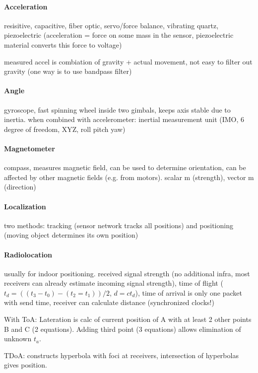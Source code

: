 \documentclass{article}
\begin{document}
\begin{multicols}{2}
    \paragraph{Acceleration} resisitive, capacitive, fiber optic, servo/force balance, vibrating quartz, piezoelectric (acceleration = force on some mass in the sensor, piezoelectric material converts this force to voltage)

    measured accel is combiation of gravity + actual movement, not easy to filter out gravity (one way is to use bandpass filter)

    \paragraph{Angle} gyroscope, fast spinning wheel inside two gimbals, keeps axis stable due to inertia. when combined with accelerometer: inertial measurement unit (IMO, 6 degree of freedom, XYZ, roll pitch yaw)

    \paragraph{Magnetometer} compass, measures magnetic field, can be used to determine orientation, can be affected by other magnetic fields (e.g. from motors). scalar m (strength), vector m (direction)

    \paragraph{Localization} two methods: tracking (sensor network tracks all positions) and positioning (moving object determines its own position)

    \paragraph{Radiolocation} usually for indoor positioning. received signal strength (no additional infra, most receivers can already estimate incoming signal strength), time of flight ($t_d = ((t_3 - t_0) - (t_2 = t_1)) / 2$, $d = ct_d$), time of arrival is only one packet with send time, receiver can calculate distance (synchronized clocks!)

    With ToA: Lateration is calc of current position of A with at least 2 other points B and C (2 equations). Adding third point (3 equations) allows elimination of unknown $t_a$.

    TDoA: constructs hyperbola with foci at receivers, intersection of hyperbolas gives position.


\end{multicols}
\end{document}
